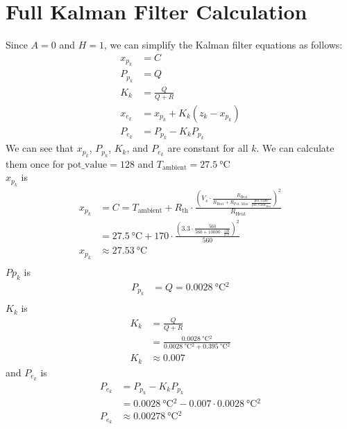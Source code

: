 \documentclass[12pt,a4paper]{article}
\begin{document}
\newpage



\newpage
\appendix
\section{Full Kalman Filter Calculation}
\label{app:kalman-filter}
Since $A=0$ and $H=1$, we can simplify the Kalman filter equations as follows:
\begin{align*}
    x_{p_k} &= C \\
    P_{p_k} &= Q \\
    K_k &= \frac{Q}{Q + R} \\
    x_{e_k} &= x_{p_k} + K_k (z_k - x_{p_k}) \\
    P_{e_k} &= P_{p_k} - K_k P_{p_k}
\end{align*}
We can see that $x_{p_k}$, $P_{p_k}$, $K_k$, and $P_{e_k}$ are constant for all $k$. We can calculate them once for $\text{pot\_value} = 128$ and $T_{\text{ambient}} = \SI{27.5}{\degreeCelsius}$ \\ $x_{p_k}$ is
\begin{align*}
    x_{p_k} &= C = T_{\text{ambient}} + R_{\text{th}} \cdot \frac{\left(V_s \cdot \frac{R_{\text{Heat}}}{R_{\text{Heat}} + R_{\text{Pot, Max}} \cdot \frac{\text{pot\_value}}{\text{pot\_value}_{\text{Max}}}}\right)^2}{R_{\text{Heat}}} \\
        &= \SI{27.5}{\degreeCelsius} + 170 \cdot \frac{\left(3.3 \cdot \frac{560}{560 + 10000 \cdot \frac{128}{255}}\right)^2}{560} \\
        x_{p_k} &\approx \SI{27.53}{\degreeCelsius} \\
\end{align*}
$P{p_k}$ is
\begin{align*}
    P_{p_k} &= Q = \SI{0.0028}{\degreeCelsius^2} \\
\end{align*}
$K_k$ is
\begin{align*}
    K_k &= \frac{Q}{Q + R} \\
    &= \frac{\SI{0.0028}{\degreeCelsius^2}}{\SI{0.0028}{\degreeCelsius^2} + \SI{0.395}{\degreeCelsius^2}} \\
    K_k &\approx 0.007
\end{align*}
and $P_{e_k}$ is
\begin{align*}
    P_{e_k} &= P_{p_k} - K_k P_{p_k} \\
    &= \SI{0.0028}{\degreeCelsius^2} - 0.007 \cdot \SI{0.0028}{\degreeCelsius^2} \\
    P_{e_k} &\approx \SI{0.00278}{\degreeCelsius^2}
\end{align*}
\end{document}
